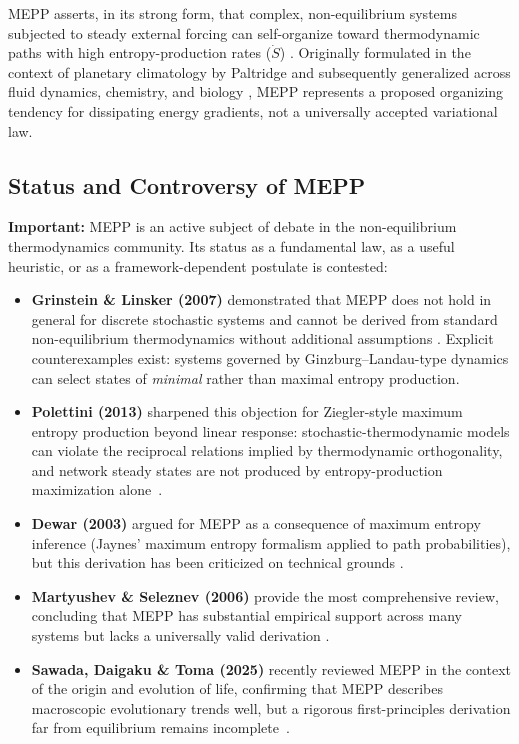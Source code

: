 \documentclass[12pt,a4paper]{article}
\theoremstyle{remark}
\begin{document}
MEPP asserts, in its strong form, that complex, non-equilibrium systems subjected to steady external forcing can self-organize toward thermodynamic paths with high entropy-production rates ($\dot{S}$) \citep{MEPPFoundations}. Originally formulated in the context of planetary climatology by Paltridge \citep{Paltridge1975} and subsequently generalized across fluid dynamics, chemistry, and biology \citep{MEPP2004}, MEPP represents a proposed organizing tendency for dissipating energy gradients, not a universally accepted variational law.

\subsection{Status and Controversy of MEPP}

\textbf{Important:} MEPP is an active subject of debate in the non-equilibrium thermodynamics community. Its status as a fundamental law, as a useful heuristic, or as a framework-dependent postulate is contested:

\begin{itemize}
    \item \textbf{Grinstein \& Linsker (2007)} demonstrated that MEPP does not hold in general for discrete stochastic systems and cannot be derived from standard non-equilibrium thermodynamics without additional assumptions \citep{GrinsteinLinsker2007}. Explicit counterexamples exist: systems governed by Ginzburg--Landau-type dynamics can select states of \emph{minimal} rather than maximal entropy production.
    \item \textbf{Polettini (2013)} sharpened this objection for Ziegler-style maximum entropy production beyond linear response: stochastic-thermodynamic models can violate the reciprocal relations implied by thermodynamic orthogonality, and network steady states are not produced by entropy-production maximization alone~\citep{Polettini2013}.
    \item \textbf{Dewar (2003)} argued for MEPP as a consequence of maximum entropy inference (Jaynes' maximum entropy formalism \citep{Jaynes1957} applied to path probabilities), but this derivation has been criticized on technical grounds \citep{Dewar2003}.
    \item \textbf{Martyushev \& Seleznev (2006)} provide the most comprehensive review, concluding that MEPP has substantial empirical support across many systems but lacks a universally valid derivation \citep{MartyushevSeleznev2006}.
    \item \textbf{Sawada, Daigaku \& Toma (2025)} recently reviewed MEPP in the context of the origin and evolution of life, confirming that MEPP describes macroscopic evolutionary trends well, but a rigorous first-principles derivation far from equilibrium remains incomplete~\citep{Sawada2025}.
\end{itemize}
\end{document}
